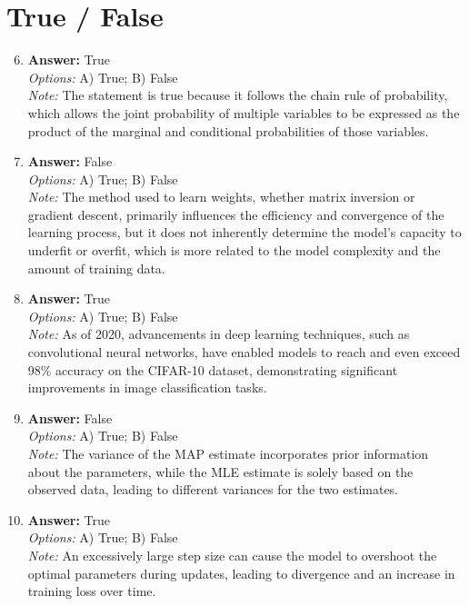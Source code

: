 \documentclass[12pt]{article}
\begin{document}
\section*{True / False}
\begin{enumerate}[label=\arabic*.]
\setcounter{enumi}{5}
\item \textbf{Answer:} True
\\ \textit{Options:} A) True; B) False
\\ \textit{Note:} The statement is true because it follows the chain rule of probability, which allows the joint probability of multiple variables to be expressed as the product of the marginal and conditional probabilities of those variables.
\item \textbf{Answer:} False
\\ \textit{Options:} A) True; B) False
\\ \textit{Note:} The method used to learn weights, whether matrix inversion or gradient descent, primarily influences the efficiency and convergence of the learning process, but it does not inherently determine the model's capacity to underfit or overfit, which is more related to the model complexity and the amount of training data.
\item \textbf{Answer:} True
\\ \textit{Options:} A) True; B) False
\\ \textit{Note:} As of 2020, advancements in deep learning techniques, such as convolutional neural networks, have enabled models to reach and even exceed 98\% accuracy on the CIFAR-10 dataset, demonstrating significant improvements in image classification tasks.
\item \textbf{Answer:} False
\\ \textit{Options:} A) True; B) False
\\ \textit{Note:} The variance of the MAP estimate incorporates prior information about the parameters, while the MLE estimate is solely based on the observed data, leading to different variances for the two estimates.
\item \textbf{Answer:} True
\\ \textit{Options:} A) True; B) False
\\ \textit{Note:} An excessively large step size can cause the model to overshoot the optimal parameters during updates, leading to divergence and an increase in training loss over time.
\end{enumerate}
\end{document}
